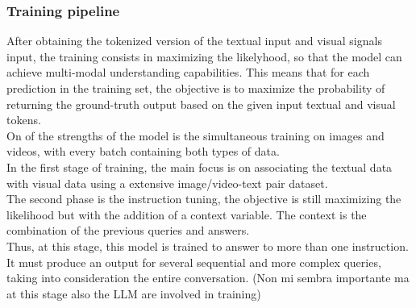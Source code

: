 \documentclass[conference]{IEEEtran}
\begin{document}
\subsubsection{Training pipeline}
After obtaining the tokenized version of the textual input and visual signals input, the training consists in maximizing the likelyhood, so that the model can achieve multi-modal understanding capabilities.
This means that for each prediction in the training set, the objective is to maximize the probability of returning the ground-truth output based on the given input textual and visual tokens. \\
On of the strengths of the model is the simultaneous training on images and videos, with every batch containing both types of data.\\
In the first stage of training, the main focus is on associating the textual data with visual data using a extensive image/video-text pair dataset.\\
The second phase is the instruction tuning, the objective is still maximizing the likelihood but with the addition of a context variable. The context is the combination of the previous queries and answers.\\
Thus, at this stage, this model is trained to answer to more than one instruction. It must produce an output for several sequential and more complex queries, taking into consideration the entire conversation.
(Non mi sembra importante ma at this stage also the LLM are involved in training)
\end{document}
